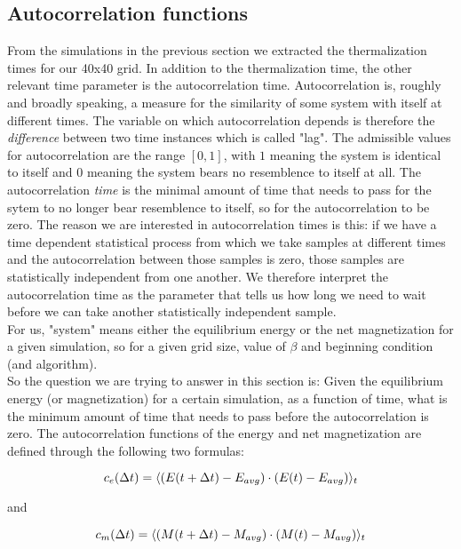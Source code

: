 \documentclass[11pt,a4paper]{article}
\DeclarePairedDelimiter{\avg}{\langle}{\rangle}
\begin{document}
\subsection{Autocorrelation functions}
From the simulations in the previous section we extracted the thermalization times for our 40x40 grid. In addition to the thermalization
 time, the other relevant time parameter is the autocorrelation time. Autocorrelation is, roughly and broadly speaking, a measure for the
 similarity of some system with itself at different times. The variable on which autocorrelation depends is therefore the \textit{difference}
 between two time instances which is called "lag". The admissible values for autocorrelation are the range $[0,1]$, with $1$ meaning
 the system is identical to itself and $0$ meaning the system bears no resemblence to itself at all.
 The autocorrelation \textit{time} is the minimal amount of time that needs to pass for the sytem to no
 longer bear resemblence to itself, so for the autocorrelation to be zero. The reason we are interested in autocorrelation times is this:
 if we have a time dependent statistical process from which we
 take samples at different times and the autocorrelation between those samples is zero, those samples are statistically independent from 
 one another. We therefore interpret the autocorrelation time as the parameter that tells us how long we need to wait before we can take
 another statistically independent sample. 
 \\ 
 

 For us, "system" means either the equilibrium energy or the net magnetization for a given simulation, so for a given grid 
 size, value of $\beta$ and beginning condition (and algorithm). \\
 So the question we are trying to answer in this section is: Given the equilibrium energy (or magnetization) for a certain simulation, as a
 function of time, what is the minimum amount of time that needs to pass before the autocorrelation is zero. 
 The autocorrelation functions of the energy and net magnetization are defined through the following two formulas:

\begin{equation*}
    c_e(\Delta t) = \avg{(E(t+\Delta t) - E_{avg})\cdot (E(t)-E_{avg})}_t
\end{equation*}

and

\begin{equation*}
    c_m(\Delta t) = \avg{(M(t+\Delta t) - M_{avg})\cdot (M(t)-M_{avg})}_t
\end{equation*}
\end{document}
